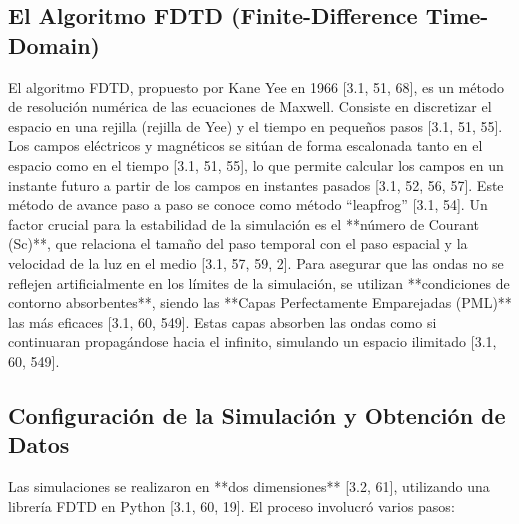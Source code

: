 \subsection{El Algoritmo FDTD (Finite-Difference Time-Domain)} El algoritmo FDTD, propuesto por Kane Yee en 1966 [3.1, 51, 68], es un método de resolución numérica de las ecuaciones de Maxwell. Consiste en discretizar el espacio en una rejilla (rejilla de Yee) y el tiempo en pequeños pasos [3.1, 51, 55]. Los campos eléctricos y magnéticos se sitúan de forma escalonada tanto en el espacio como en el tiempo [3.1, 51, 55], lo que permite calcular los campos en un instante futuro a partir de los campos en instantes pasados [3.1, 52, 56, 57]. Este método de avance paso a paso se conoce como método ``leapfrog'' [3.1, 54]. Un factor crucial para la estabilidad de la simulación es el **número de Courant (Sc)**, que relaciona el tamaño del paso temporal con el paso espacial y la velocidad de la luz en el medio [3.1, 57, 59, 2]. Para asegurar que las ondas no se reflejen artificialmente en los límites de la simulación, se utilizan **condiciones de contorno absorbentes**, siendo las **Capas Perfectamente Emparejadas (PML)** las más eficaces [3.1, 60, 549]. Estas capas absorben las ondas como si continuaran propagándose hacia el infinito, simulando un espacio ilimitado [3.1, 60, 549]. 

\subsection{Configuración de la Simulación y Obtención de Datos} Las simulaciones se realizaron en **dos dimensiones** [3.2, 61], utilizando una librería FDTD en Python [3.1, 60, 19]. El proceso involucró varios pasos: 

